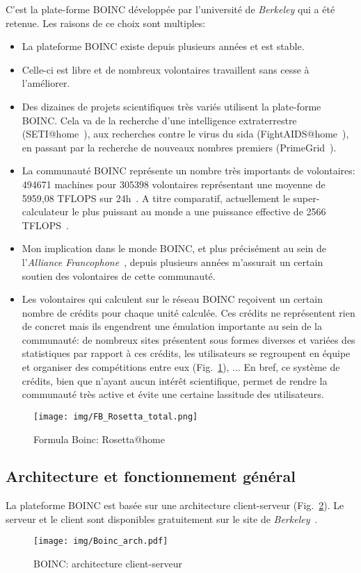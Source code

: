 \documentclass[a4paper, 11pt]{report}
\begin{document}
C'est la plate-forme \textsc{BOINC} développée par l'université de \textit{Berkeley} qui a été retenue. Les raisons de ce choix sont multiples:
\begin{itemize}
\item La plateforme \textsc{BOINC} existe depuis plusieurs années et est stable.
\item Celle-ci est libre et de nombreux volontaires travaillent sans cesse à l'améliorer.
\item Des dizaines de projets scientifiques très variés utilisent la plate-forme \textsc{BOINC}. Cela va de la recherche d'une intelligence extraterrestre (SETI@home~\cite{SETI}), aux recherches contre le virus du sida (FightAIDS@home~\cite{FIGHTAIDS}), en passant par la recherche de nouveaux nombres premiers (PrimeGrid~\cite{PRIMEGRID}).
\item La communauté \textsc{BOINC} représente un nombre très importants de volontaires: 494671 machines pour 305398 volontaires représentant une moyenne de 5959,08 TFLOPS sur 24h~\cite{BOINC}. A titre comparatif, actuellement le super-calculateur le plus puissant au monde a une puissance effective de 2566 TFLOPS~\cite{TOP500}.
\item Mon implication dans le monde \textsc{BOINC}, et plus précisément au sein de l'\textit{Alliance Francophone}~\cite{AF}, depuis plusieurs années m'assurait un certain soutien des volontaires de cette communauté.
\item Les volontaires qui calculent sur le réseau \textsc{BOINC} reçoivent un certain nombre de crédits pour chaque unité calculée. Ces crédits ne représentent rien de concret mais ils engendrent une émulation importante au sein de la communauté: de nombreux sites présentent sous formes diverses et variées des statistiques par rapport à ces crédits, les utilisateurs se regroupent en équipe et organiser des compétitions entre eux (Fig.~\ref{fb}), ... En bref, ce système de crédits, bien que n'ayant aucun intérêt scientifique, permet de rendre la communauté très active et évite une certaine lassitude des utilisateurs.\label{credits}
\end{itemize}

\begin{figure}[!h]
\centering
\texttt{[image: img/FB\_Rosetta\_total.png]}
\caption{Formula Boinc: Rosetta@home~\cite{SEB}}
\label{fb}
\end{figure}


\subsection{Architecture et fonctionnement général}
La plateforme \textsc{BOINC} est basée sur une architecture client-serveur (Fig.~\ref{clientserveur}). Le serveur et le client sont disponibles gratuitement sur le site de \textit{Berkeley}~\cite{BOINC}.
\begin{figure}[!h]
\centering
\texttt{[image: img/Boinc\_arch.pdf]}
\caption{\textsc{BOINC}: architecture client-serveur}
\label{clientserveur}
\end{figure}
\end{document}
